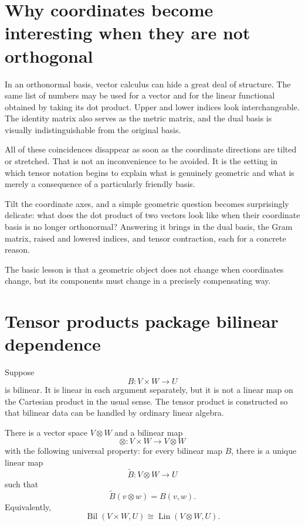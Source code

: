 
\section{Why coordinates become interesting when they are not orthogonal}

In an orthonormal basis, vector calculus can hide a great deal of structure.  The same list of numbers may be used for a vector and for the linear functional obtained by taking its dot product.  Upper and lower indices look interchangeable.  The identity matrix also serves as the metric matrix, and the dual basis is visually indistinguishable from the original basis.

All of these coincidences disappear as soon as the coordinate directions are tilted or stretched.  That is not an inconvenience to be avoided.  It is the setting in which tensor notation begins to explain what is genuinely geometric and what is merely a consequence of a particularly friendly basis.

Tilt the coordinate axes, and a simple geometric question becomes surprisingly delicate: what does the dot product of two vectors look like when their coordinate basis is no longer orthonormal? Answering it brings in the dual basis, the Gram matrix, raised and lowered indices, and tensor contraction, each for a concrete reason.

The basic lesson is that a geometric object does not change when coordinates change, but its components must change in a precisely compensating way.

\section{Tensor products package bilinear dependence}

Suppose
\[
  B:V\times W\longrightarrow U
\]
is bilinear.  It is linear in each argument separately, but it is not a linear map on the Cartesian product in the usual sense.  The tensor product is constructed so that bilinear data can be handled by ordinary linear algebra.

There is a vector space \(V\otimes W\) and a bilinear map
\[
  \otimes:V\times W\longrightarrow V\otimes W
\]
with the following universal property: for every bilinear map \(B\), there is a unique linear map
\[
  \widetilde B:V\otimes W\longrightarrow U
\]
such that
\[
  \widetilde B(v\otimes w)=B(v,w).
\]
Equivalently,
\[
  \operatorname{Bil}(V\times W,U)
  \cong
  \operatorname{Lin}(V\otimes W,U).
\]

